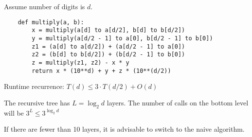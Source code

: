 \documentclass[english]{exam}
\begin{document}
    Assume number of digits is $d$.
    
    \begin{lstlisting}
    def multiply(a, b):
        x = multiply(a[d] to a[d/2], b[d] to b[d/2])
        y = multiply(a[d/2 - 1] to a[0], b[d/2 - 1] to b[0])
        z1 = (a[d] to a[d/2]) + (a[d/2 - 1] to a[0])
        z2 = (b[d] to b[d/2]) + (b[d/2 - 1] to b[0])
        z = multiply(z1, z2) - x * y
        return x * (10**d) + y + z * (10**(d/2))
    \end{lstlisting}
    
    Runtime recurrence: $T(d) \leq 3 \cdot T(d/2) + O(d)$
    
    The recursive tree has $L = \log_2 d$ layers. The number of calls on the bottom level will be $3^L \leq 3^{\log_2 d}$
    
    If there are fewer than 10 layers, it is advisable to switch to the naive algorithm.

    
\end{document}
